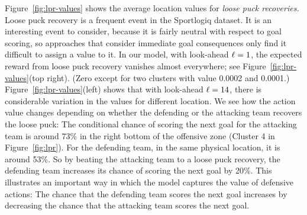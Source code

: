 Figure~\ref{fig:lpr-values} shows the average location values for {\em loose puck recoveries.} Loose puck recovery is a frequent event in the Sportlogiq dataset. It is an interesting event to consider, because it is fairly neutral with respect to goal scoring, so approaches that consider immediate goal consequences only find it difficult to assign a value to it. In our model, with look-ahead $\ell = 1$, the expected reward from loose puck recovery vanishes almost everywhere; see Figure~\ref{fig:lpr-values}(top right). (Zero except for two clusters with value 0.0002 and 0.0001.) Figure~\ref{fig:lpr-values}(left) shows that with look-ahead $\ell = 14$, there is considerable variation in the values for different location. We see how the action value changes depending on whether the defending or the attacking team recovers the loose puck: The conditional chance of scoring the next goal for the attacking team is around 73\% in the right bottom of the offensive zone (Cluster 4 in Figure~\ref{fig:lpr}). For the defending team, in the same physical location, it is around 53\%. So by beating the attacking team to a loose puck recovery, the defending team increases its chance of scoring the next goal by 20\%.  This illustrates an important way in which the model captures the value of defensive actions: The chance that the defending team scores the next goal increases by decreasing the chance that the attacking team scores the next goal. 

